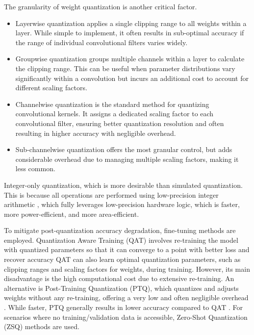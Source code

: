 The granularity of weight quantization is another critical factor. 
\begin{itemize} 
    \item Layerwise quantization applies a single clipping range to all weights within a layer. While simple to implement, it often results in sub-optimal accuracy if the range of individual convolutional filters varies widely. 
    \item Groupwise quantization groups multiple channels within a layer to calculate the clipping range. This can be useful when parameter distributions vary significantly within a convolution but incurs an additional cost to account for different scaling factors. 
    \item Channelwise quantization is the standard method for quantizing convolutional kernels. It assigns a dedicated scaling factor to each convolutional filter, ensuring better quantization resolution and often resulting in higher accuracy with negligible overhead. 
    \item Sub-channelwise quantization offers the most granular control, but adds considerable overhead due to managing multiple scaling factors, making it less common. 
\end{itemize}

Integer-only quantization, which is more desirable than simulated quantization. This is because all operations are performed using low-precision integer arithmetic \cite{Zhu2020Survey}, which fully leverages low-precision hardware logic, which is faster, more power-efficient, and more area-efficient.

To mitigate post-quantization accuracy degradation, fine-tuning methods are employed. Quantization Aware Training (QAT) involves re-training the model with quantized parameters so that it can converge to a point with better loss and recover accuracy \cite{Zhu2020Survey} QAT can also learn optimal quantization parameters, such as clipping ranges and scaling factors for weights, during training. However, its main disadvantage is the high computational cost due to extensive re-training. An alternative is Post-Training Quantization (PTQ), which quantizes and adjusts weights without any re-training, offering a very low and often negligible overhead \cite{Zhu2020Survey}. While faster, PTQ generally results in lower accuracy compared to QAT \cite{Zhu2020Survey}. For scenarios where no training/validation data is accessible, Zero-Shot Quantization (ZSQ) methods are used. 


